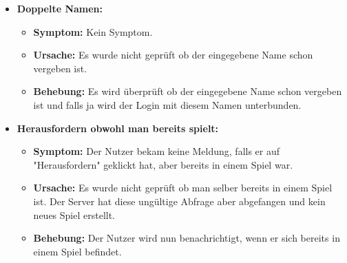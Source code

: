 \documentclass[parskip=full]{scrartcl}
\begin{document}
\begin{itemize}
\item{\textbf{Doppelte Namen:}}
\begin{itemize}
	\item{\textbf{Symptom:}} Kein Symptom.
	\item{\textbf{Ursache:}} Es wurde nicht geprüft ob der eingegebene Name schon vergeben ist.
	\item{\textbf{Behebung:}} Es wird überprüft ob der eingegebene Name schon vergeben ist und falls ja wird der Login mit diesem Namen unterbunden.
\end{itemize}

\item{\textbf{Herausfordern obwohl man bereits spielt:}}
\begin{itemize}
	\item{\textbf{Symptom:}} Der Nutzer bekam keine Meldung, falls er auf "Herausfordern" geklickt hat, aber bereits in einem Spiel war.
	\item{\textbf{Ursache:}} Es wurde nicht geprüft ob man selber bereits in einem Spiel ist. Der Server hat diese ungültige Abfrage aber abgefangen und kein neues Spiel erstellt. 
	\item{\textbf{Behebung:}} Der Nutzer wird nun benachrichtigt, wenn er sich bereits in einem Spiel befindet.
\end{itemize}

\end{itemize}
\end{document}
